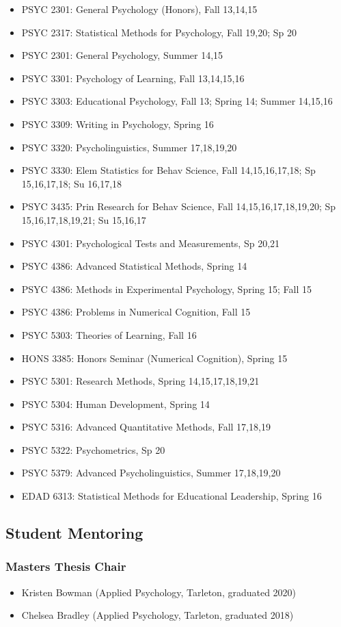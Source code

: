 \documentclass[article,10pt]{article}
\begin{document}
\begin{itemize}
\item PSYC 2301: General Psychology (Honors), Fall 13,14,15
\item PSYC 2317: Statistical Methods for Psychology, Fall 19,20; Sp 20
\item PSYC 2301: General Psychology, Summer 14,15
\item PSYC 3301: Psychology of Learning, Fall 13,14,15,16
\item PSYC 3303: Educational Psychology, Fall 13; Spring 14; Summer 14,15,16
\item PSYC 3309: Writing in Psychology, Spring 16
\item PSYC 3320: Psycholinguistics, Summer 17,18,19,20
\item PSYC 3330: Elem Statistics for Behav Science, Fall 14,15,16,17,18; Sp 15,16,17,18; Su 16,17,18
\item PSYC 3435: Prin Research for Behav Science, Fall 14,15,16,17,18,19,20; Sp 15,16,17,18,19,21; Su 15,16,17
\item PSYC 4301: Psychological Tests and Measurements, Sp 20,21
\item PSYC 4386: Advanced Statistical Methods, Spring 14
\item PSYC 4386: Methods in Experimental Psychology, Spring 15; Fall 15
\item PSYC 4386: Problems in Numerical Cognition, Fall 15
\item PSYC 5303: Theories of Learning, Fall 16
\item HONS 3385: Honors Seminar (Numerical Cognition), Spring 15
\item PSYC 5301: Research Methods, Spring 14,15,17,18,19,21
\item PSYC 5304: Human Development, Spring 14
\item PSYC 5316: Advanced Quantitative Methods, Fall 17,18,19
\item PSYC 5322: Psychometrics, Sp 20
\item PSYC 5379: Advanced Psycholinguistics, Summer 17,18,19,20
\item EDAD 6313: Statistical Methods for Educational Leadership, Spring 16
\end{itemize}

\subsection*{Student Mentoring}
\label{sec:orgd40d96c}
\subsubsection*{Masters Thesis Chair}
\label{sec:org79a5ab7}
\begin{itemize}
\item Kristen Bowman (Applied Psychology, Tarleton, graduated 2020)
\item Chelsea Bradley (Applied Psychology, Tarleton, graduated 2018)
\end{itemize}
\end{document}
